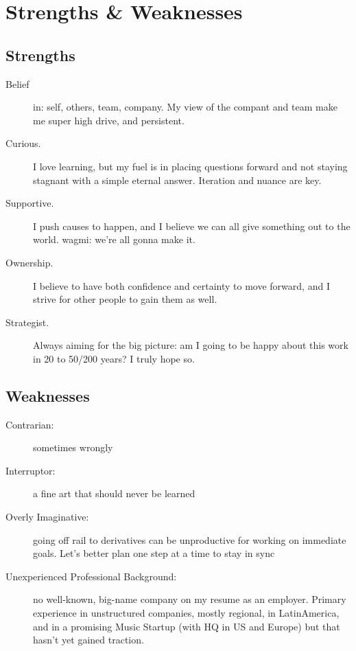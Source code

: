 \documentclass[10pt, a4paper, twocolumn]{article}
\begin{document}




\clearpage

\section*{Strengths \& Weaknesses}

\subsection*{Strengths}

\begin{description}
 \item[Belief] in: self, others, team, company. My view of the compant and team make me super high drive, and persistent.
\item[Curious.] I love learning, but my fuel is in placing questions forward and not staying stagnant with a simple eternal answer. Iteration and nuance are key.
\item[Supportive.] I push causes to happen, and I believe we can all give something out to the world. wagmi: we're all gonna make it.
\item[Ownership.] I believe to have both confidence and certainty to move forward, and I strive for other people to gain them as well.
\item[Strategist.] Always aiming for the big picture: am I going to be happy about this work in 20 to 50/200 years? I truly hope so.
 \end{description}

\subsection*{Weaknesses}

\begin{description}
 \item[Contrarian:] sometimes wrongly
 \item[Interruptor:] a fine art that should never be learned
 \item[Overly Imaginative:] going off rail to derivatives can be unproductive for working on immediate goals. Let's better plan one step at a time %
 to stay in sync
 \item[Unexperienced Professional Background:]
no well-known, big-name company on my resume as an employer.
Primary experience in unstructured companies, mostly regional, in LatinAmerica, and in a promising Music Startup (with HQ in US and Europe) but that hasn't yet gained traction.
 \end{description}
\end{document}

